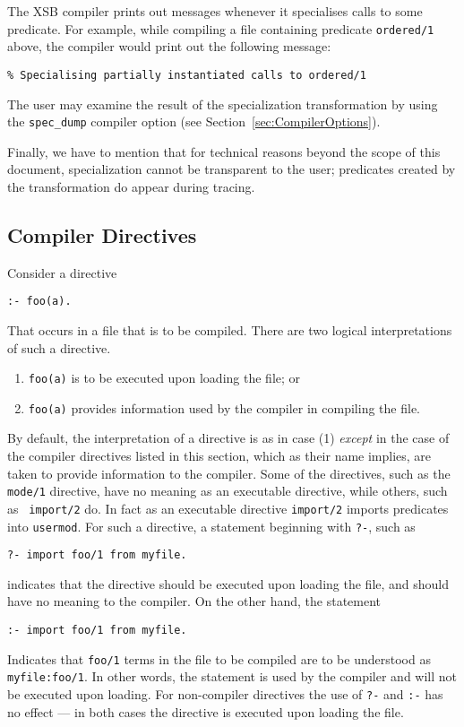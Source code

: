 The XSB compiler prints out messages whenever it specialises
calls to some predicate.  For example, while compiling a file
containing predicate {\tt ordered/1} above, the compiler would print
out the following message:
\begin{center}
{\tt	\% Specialising partially instantiated calls to ordered/1}
\end{center}
The user may examine the result of the specialization transformation
by using the {\tt spec\_dump} compiler option
(see Section~\ref{sec:CompilerOptions}).

Finally, we have to mention that for technical reasons beyond the scope of
this document, specialization cannot be transparent to the user; predicates
created by the transformation do appear during tracing.


\subsection{Compiler Directives}\label{compiler_directives}

Consider a directive
\begin{verbatim}
:- foo(a).
\end{verbatim}
That occurs in a file that is to be compiled.  There are two logical
interpretations of such a directive.
\begin{enumerate}
\item {\tt foo(a)} is to be executed upon loading the file; or
%
\item{\tt foo(a)} provides information used by the compiler in
compiling the file. 
\end{enumerate}

By default, the interpretation of a directive is as in case (1) {\em
except} in the case of the compiler directives listed in this section,
which as their name implies, are taken to provide information to the
compiler.  Some of the directives, such as the {\tt mode/1} directive,
have no meaning as an executable directive, while others, such as {\tt
import/2} do.  In fact as an executable directive {\tt import/2}
imports predicates into {\tt usermod}.  For such a directive, a 
statement beginning with {\tt ?-}, such as 
\begin{verbatim}
?- import foo/1 from myfile.
\end{verbatim}
indicates that the directive should be executed upon loading the file,
and should have no meaning to the compiler.  On the other hand, the
statement
\begin{verbatim}
:- import foo/1 from myfile.
\end{verbatim}
Indicates that {\tt foo/1} terms in the file to be compiled are to be
understood as {\tt myfile:foo/1}.  In other words, the statement is
used by the compiler and will not be executed upon loading.  For
non-compiler directives the use of {\tt ?-} and {\tt :-} has no effect
--- in both cases the directive is executed upon loading the file.

